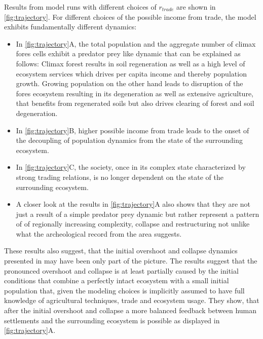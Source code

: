 Results from model runs with different choices of $r_{trade}$ are shown in \cref{fig:trajectory}. For different choices of the possible income from trade, the model exhibits fundamentally different dynamics:
\begin{itemize}
  \item In \cref{fig:trajectory}A, the total population and the aggregate number of climax fores cells exhibit a predator prey like dynamic that can be explained as follows: Climax forest results in soil regeneration as well as a high level of ecosystem services which drives per capita income and thereby population growth. Growing population on the other hand leads to disruption of the fores ecosystem resulting in its degeneration as well as extensive agriculture, that benefits from regenerated soils but also drives clearing of forest and soil degeneration.
  \item In \cref{fig:trajectory}B, higher possible income from trade leads to the onset of the decoupling of population dynamics from the state of the surrounding ecosystem. 
  \item In \cref{fig:trajectory}C, the society, once in its complex state characterized by strong trading relations, is no longer dependent on the state of the surrounding ecosystem.
  \item A closer look at the results in \cref{fig:trajectory}A also shows that they are not just a result of a simple predator prey dynamic but rather represent a pattern of of regionally increasing complexity, collapse and restructuring not unlike what the archeological record from the area suggests.
\end{itemize}
These results also suggest, that the initial overshoot and collapse dynamics presented in \cite{Heckbert2013} may have been only part of the picture. The results suggest that the pronounced overshoot and collapse is at least partially caused by the initial conditions that combine a perfectly intact ecosystem with a small initial population that, given the modeling choices is implicitly assumed to have full knowledge of agricultural techniques, trade and ecosystem usage. They show, that after the initial overshoot and collapse a more balanced feedback between human settlements and the surrounding ecosystem is possible as displayed in \cref{fig:trajectory}A.

